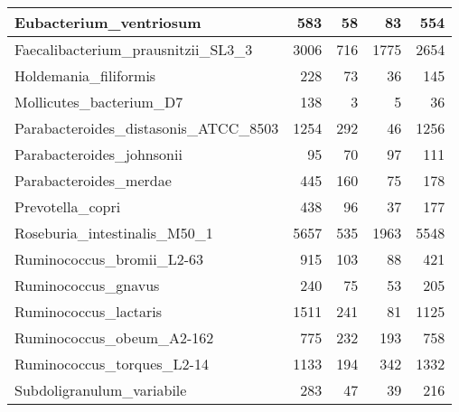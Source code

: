 \documentclass[12pt,a4paper]{article}
\begin{document}
\begin{table}[ht]
\begin{center}
\begin{tabular}{|l*{4}{|r}|}
Eubacterium\_ventriosum & 583 & 58 & 83 & 554 \\ \hline
Faecalibacterium\_prausnitzii\_SL3\_3 & 3006 & 716 & 1775 & 2654 \\ \hline
Holdemania\_filiformis & 228 & 73 & 36 & 145 \\ \hline
Mollicutes\_bacterium\_D7 & 138 & 3 & 5 & 36 \\ \hline
Parabacteroides\_distasonis\_ATCC\_8503 & 1254 & 292 & 46 & 1256 \\ \hline
Parabacteroides\_johnsonii & 95 & 70 & 97 & 111 \\ \hline
Parabacteroides\_merdae & 445 & 160 & 75 & 178 \\ \hline
Prevotella\_copri & 438 & 96 & 37 & 177 \\ \hline
Roseburia\_intestinalis\_M50\_1 & 5657 & 535 & 1963 & 5548 \\ \hline
Ruminococcus\_bromii\_L2-63 & 915 & 103 & 88 & 421 \\ \hline
Ruminococcus\_gnavus & 240 & 75 & 53 & 205 \\ \hline
Ruminococcus\_lactaris & 1511 & 241 & 81 & 1125 \\ \hline
Ruminococcus\_obeum\_A2-162 & 775 & 232 & 193 & 758 \\ \hline
Ruminococcus\_torques\_L2-14 & 1133 & 194 & 342 & 1332 \\ \hline
Subdoligranulum\_variabile & 283 & 47 & 39 & 216 \\ \hline
\end{tabular}
\end{center}
\end{table}
\end{document}
